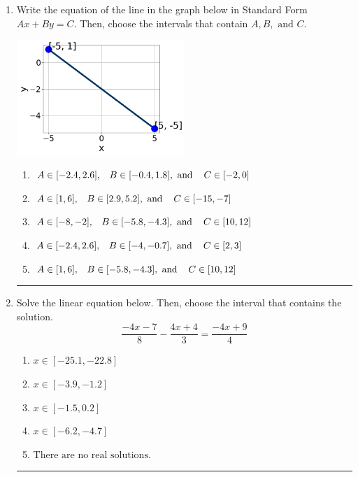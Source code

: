 \documentclass[14pt]{extbook}
\newcommand{\litem}[1]{\item#1\hspace*{-1cm}\rule{\textwidth}{0.4pt}}
\begin{document}
\begin{enumerate}
{\begin{enumerate}[label=\Alph*.]
\end{enumerate} }
\litem{
Write the equation of the line in the graph below in Standard Form $Ax+By=C$. Then, choose the intervals that contain $A, B, \text{ and } C$.
\begin{center}
    \includegraphics[width=0.5\textwidth]{../Figures/linearGraphToStandardA.png}
\end{center}
\begin{enumerate}[label=\Alph*.]
\item \( A \in [-2.4, 2.6], \hspace{3mm} B \in [-0.4, 1.8], \text{ and } \hspace{3mm} C \in [-2, 0] \)
\item \( A \in [1, 6], \hspace{3mm} B \in [2.9, 5.2], \text{ and } \hspace{3mm} C \in [-15, -7] \)
\item \( A \in [-8, -2], \hspace{3mm} B \in [-5.8, -4.3], \text{ and } \hspace{3mm} C \in [10, 12] \)
\item \( A \in [-2.4, 2.6], \hspace{3mm} B \in [-4, -0.7], \text{ and } \hspace{3mm} C \in [2, 3] \)
\item \( A \in [1, 6], \hspace{3mm} B \in [-5.8, -4.3], \text{ and } \hspace{3mm} C \in [10, 12] \)

\end{enumerate} }
\litem{
Solve the linear equation below. Then, choose the interval that contains the solution.\[ \frac{-4x -7}{8} - \frac{4x + 4}{3} = \frac{-4x + 9}{4} \]\begin{enumerate}[label=\Alph*.]
\item \( x \in [-25.1, -22.8] \)
\item \( x \in [-3.9, -1.2] \)
\item \( x \in [-1.5, 0.2] \)
\item \( x \in [-6.2, -4.7] \)
\item \( \text{There are no real solutions.} \)


\end{enumerate}}
\end{enumerate}
\end{document}
